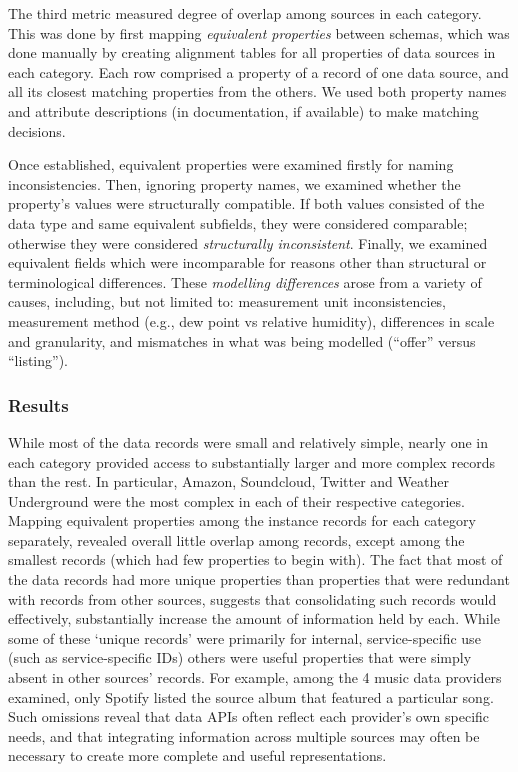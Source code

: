 \documentclass{sigchi}
\begin{document}
The third metric measured degree of overlap among sources in each category.  This was done by first mapping \emph{equivalent properties} between schemas, which was done manually by creating alignment tables for all properties of data sources in each category.  Each row comprised a property of a record of one data source, and all its closest matching properties from the others.  We used both property names and attribute descriptions (in documentation, if available) to make matching decisions.

Once established, equivalent properties were examined firstly for naming inconsistencies.  Then, ignoring property names, we examined whether the property's values were structurally compatible. If both values consisted of the data type and same equivalent subfields, they were considered comparable; otherwise they were considered \emph{structurally inconsistent}.  Finally, we examined equivalent fields which were incomparable for reasons other than structural or terminological differences.  These \emph{modelling differences} arose from a variety of causes, including, but not limited to: measurement unit inconsistencies, measurement method (e.g., dew point vs relative humidity), differences in scale and granularity, and mismatches in what was being modelled (``offer'' versus ``listing'').

\subsubsection{Results}
While most of the data records were small and relatively simple, nearly one in each category provided access to substantially larger and more complex records than the rest. In particular, Amazon, Soundcloud, Twitter and Weather Underground were the most complex in each of their respective categories. Mapping equivalent properties among the instance records for each category separately, revealed overall little overlap among records, except among the smallest records (which had few properties to begin with).  The fact that most of the data records had more unique properties than properties that were redundant with records from other sources, suggests that consolidating such records would effectively, substantially increase the amount of information held by each.  While some of these `unique records' were primarily for internal, service-specific use (such as service-specific IDs) others were useful properties that were simply absent in other sources' records.  For example, among the 4 music data providers examined, only Spotify listed the source album that featured a particular song.  Such omissions reveal that data APIs often reflect each provider's own specific needs, and that integrating information across multiple sources may often be necessary to create more complete and useful representations.
\end{document}
